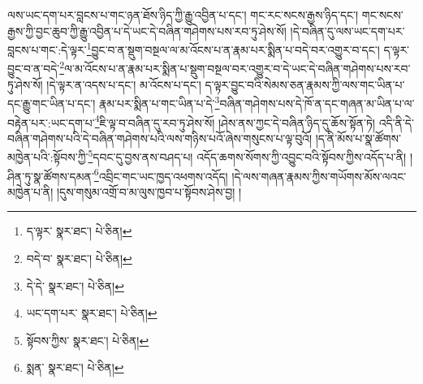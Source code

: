 ལས་ཡང་དག་པར་བླངས་པ་གང་ཉན་ཐོས་ཉིད་ཀྱི་རྒྱུ་འབྱིན་པ་དང་། གང་རང་སངས་རྒྱས་ཉིད་དང་། གང་སངས་རྒྱས་ཀྱི་བྱང་ཆུབ་ཀྱི་རྒྱུ་འབྱིན་པ་དེ་ཡང་དེ་བཞིན་གཤེགས་པས་རབ་ཏུ་ཤེས་སོ། །དེ་བཞིན་དུ་ལས་ཡང་དག་པར་བླངས་པ་གང་:དེ་ལྟར་\footnote{ད་ལྟར་  སྣར་ཐང་།  པེ་ཅིན། }བྱུང་བ་ན་སྡུག་བསྔལ་ལ་མ་འོངས་པ་ན་རྣམ་པར་སྨིན་པ་བདེ་བར་འགྱུར་བ་དང་། ད་ལྟར་བྱུང་བ་ན་བདེ་\footnote{བདེ་བ་  སྣར་ཐང་།  པེ་ཅིན། }ལ་མ་འོངས་པ་ན་རྣམ་པར་སྨིན་པ་སྡུག་བསྔལ་བར་འགྱུར་བ་དེ་ཡང་དེ་བཞིན་གཤེགས་པས་རབ་ཏུ་ཤེས་སོ། །དེ་ལྟར་ན་འདས་པ་དང་། མ་འོངས་པ་དང་། ད་ལྟར་བྱུང་བའི་སེམས་ཅན་རྣམས་ཀྱི་ལས་གང་ཡིན་པ་དང་རྒྱུ་གང་ཡིན་པ་དང་། རྣམ་པར་སྨིན་པ་གང་ཡིན་པ་དེ་\footnote{དེ་དེ་  སྣར་ཐང་།  པེ་ཅིན། }བཞིན་གཤེགས་པས་དེ་ཁོ་ན་དང་གཞན་མ་ཡིན་པ་ལ་བརྟེན་པར་:ཡང་དག་པ་\footnote{ཡང་དག་པར་  སྣར་ཐང་།  པེ་ཅིན། }ཇི་ལྟ་བ་བཞིན་དུ་རབ་ཏུ་ཤེས་སོ། །ཤེས་ནས་ཀྱང་དེ་བཞིན་ཉིད་དུ་ཆོས་སྟོན་ཏེ། འདི་ནི་དེ་བཞིན་གཤེགས་པའི་དེ་བཞིན་གཤེགས་པའི་ལས་གཉིས་པའོ་ཞེས་གསུངས་པ་ལྟ་བུའོ། །ད་ནི་མོས་པ་སྣ་ཚོགས་མཁྱེན་པའི་:སྟོབས་ཀྱི་\footnote{སྟོབས་ཀྱིས་  སྣར་ཐང་།  པེ་ཅིན། }དབང་དུ་བྱས་ནས་བཤད་པ། འདོད་ཆགས་སོགས་ཀྱི་འབྱུང་བའི་སྟོབས་ཀྱིས་འདོད་པ་ནི། །ཤིན་ཏུ་སྣ་ཚོགས་དམན་\footnote{སྨན་  སྣར་ཐང་།  པེ་ཅིན། }འབྲིང་གང་ཡང་ཁྱད་འཕགས་འདོད། །དེ་ལས་གཞན་རྣམས་ཀྱིས་གཡོགས་མོས་ལའང་མཁྱེན་པ་ནི། །དུས་གསུམ་འགྲོ་བ་མ་ལུས་ཁྱབ་པ་སྟོབས་ཤེས་བྱ། །
